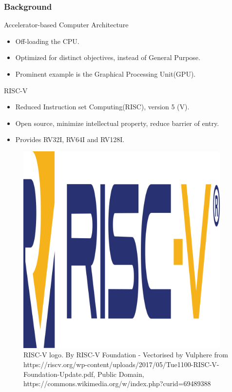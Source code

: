 
\begin{frame}[hoved]
	\frametitle{Background}
	\begin{minipage}[t]{0.45\textwidth}
		{\large Accelerator-based Computer Architecture}
		\begin{itemize}
			\item Off-loading the CPU.
			\item Optimized for distinct objectives, instead of General Purpose.
			\item Prominent example is the Graphical Processing Unit(GPU).
		\end{itemize}
		{\large RISC-V}
		\begin{itemize}
			\item Reduced Instruction set Computing(RISC), version 5 (V).
			\item Open source, minimize intellectual property, reduce barrier of entry.
			\item Provides RV32I, RV64I and RV128I.
		\end{itemize}
	\end{minipage}
	\hfill
	\begin{minipage}[t]{0.45\textwidth}
		\begin{figure}
			\begin{center}
				\includegraphics[width=0.95\textwidth]{figures/RISC-V-logo.png}
			\end{center}
			\caption{RISC-V logo. \tiny By RISC-V Foundation - Vectorised by
				Vulphere from
				https://riscv.org/wp-content/uploads/2017/05/Tue1100-RISC-V-Foundation-Update.pdf,
				Public Domain,
				https://commons.wikimedia.org/w/index.php?curid=69489388}\label{fig:riscv}
		\end{figure}
	\end{minipage}
\end{frame}

